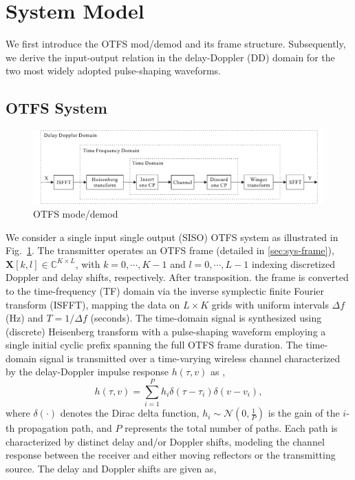 \documentclass[journal]{IEEEtran}
\begin{document}
\section{System Model}


We first introduce the OTFS mod/demod and its frame structure. Subsequently, we derive the input-output relation in the delay-Doppler (DD) domain for the two most widely adopted pulse-shaping waveforms.


\subsection{OTFS System}
\begin{figure}[!t]
  \centering
  \includegraphics[scale=1]{otfs_sys.pdf}
  \caption{OTFS mode/demod}
  \label{fig:otfs-sys}
\end{figure}
We consider a single input single output (SISO) OTFS system as illustrated in Fig.~\ref{fig:otfs-sys}. The transmitter operates an OTFS frame (detailed in \ref{sec:sys-frame}), $\mathbf X[k,l] \in \mathbb{C}^{K \times L}$, with $k = 0, \cdots, K-1$ and $l = 0, \cdots, L-1$ indexing discretized Doppler and delay shifts, respectively. After transposition. the frame is converted to the time-frequency (TF) domain via the inverse symplectic finite Fourier transform (ISFFT), mapping the data on $L\times K$ grids with uniform intervals $\Delta f$ (Hz) and $T=1/\Delta f$ (seconds).  The time-domain signal is synthesized using (discrete) Heisenberg transform with a pulse-shaping waveform employing a single initial cyclic prefix spanning the full OTFS frame duration. The time-domain signal is transmitted over a time-varying wireless channel characterized by the delay-Doppler impulse response $h(\tau, v)$ as \cite{7925924},
\begin{equation}
h(\tau, v) = \sum_{i=1}^P h_i \delta (\tau - {\tau}_i) \delta (v - v_i) ,
\end{equation}
where $\delta(\cdot)$ denotes the Dirac delta function, $h_i \sim \mathcal{N}(0, \frac{1}{P})$ is the gain of the $i$-th propagation path, and $P$ represents the total number of paths. Each path is characterized by distinct delay and/or Doppler shifts, modeling the channel response between the receiver and either moving reflectors or the transmitting source. The delay and Doppler shifts are given as,
\end{document}
